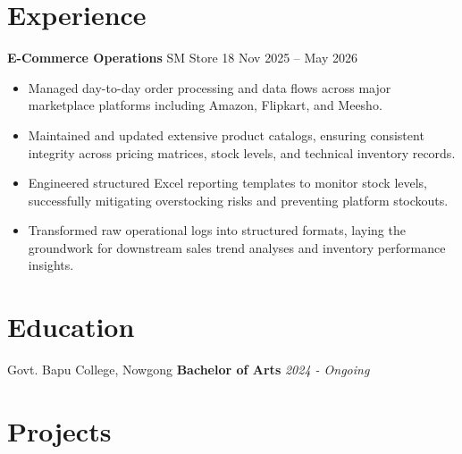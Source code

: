 \documentclass[11pt,letterpaper]{article}
\begin{document}
\section{Experience}
\noindent
\textbf{E-Commerce Operations} \textbar{} SM Store 18 \hfill Nov 2025 – May 2026 
\begin{itemize}
    \item Managed day-to-day order processing and data flows across major marketplace platforms including Amazon, Flipkart, and Meesho.
    \item Maintained and updated extensive product catalogs, ensuring consistent integrity across pricing matrices, stock levels, and technical inventory records.
    \item Engineered structured Excel reporting templates to monitor stock levels, successfully mitigating overstocking risks and preventing platform stockouts.
    \item Transformed raw operational logs into structured formats, laying the groundwork for downstream sales trend analyses and inventory performance insights.
\end{itemize}

\section{Education}
\noindent
Govt. Bapu College, Nowgong \hfill \textbf{} {\bfseries Bachelor of Arts} \hfill \textit{2024 - Ongoing}

\section{Projects}
\end{document}
